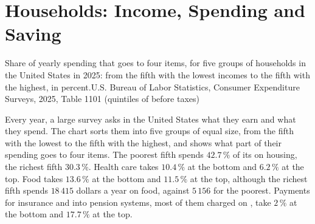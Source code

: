 \chapter{Households: Income, Spending and Saving}\label{ch:g7:households}

\begin{openingchart}{Share of yearly spending that goes to four items, for five groups of
households in the United States in 2025: from the fifth with the lowest incomes to the fifth
with the highest, in percent.}{U.S. Bureau of Labor Statistics, Consumer Expenditure Surveys,
2025, Table 1101 (quintiles of  before taxes)}
\end{openingchart}

Every year, a large survey asks  in the United States what they earn and what they
spend. The chart sorts them into five groups of equal size, from the fifth with the lowest
 to the fifth with the highest, and shows what part of their spending goes to four
items. The poorest fifth spends $42.7\,\%$ of its  on housing, the richest fifth $30.3\,\%$.
Health care takes $10.4\,\%$ at the bottom and $6.2\,\%$ at the top. Food takes $13.6\,\%$ at the
bottom and $11.5\,\%$ at the top, although the richest fifth spends $18\,415$ dollars a year on
food, against $5\,156$ for the poorest. Payments for insurance and into pension systems, most of
them charged on , take $2\,\%$ at the bottom and $17.7\,\%$ at the top.

